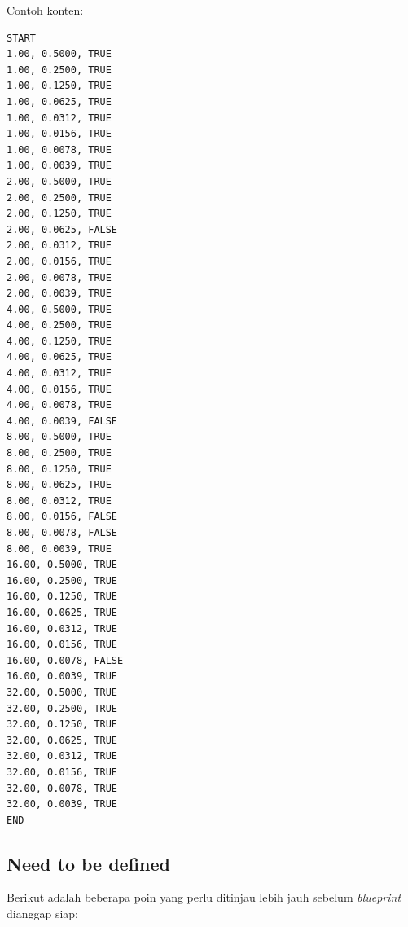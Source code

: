\documentclass[12pt,]{article}
\begin{document}
	Contoh konten:
	\begin{verbatim}
START
1.00, 0.5000, TRUE
1.00, 0.2500, TRUE
1.00, 0.1250, TRUE
1.00, 0.0625, TRUE
1.00, 0.0312, TRUE
1.00, 0.0156, TRUE
1.00, 0.0078, TRUE
1.00, 0.0039, TRUE
2.00, 0.5000, TRUE
2.00, 0.2500, TRUE
2.00, 0.1250, TRUE
2.00, 0.0625, FALSE
2.00, 0.0312, TRUE
2.00, 0.0156, TRUE
2.00, 0.0078, TRUE
2.00, 0.0039, TRUE
4.00, 0.5000, TRUE
4.00, 0.2500, TRUE
4.00, 0.1250, TRUE
4.00, 0.0625, TRUE
4.00, 0.0312, TRUE
4.00, 0.0156, TRUE
4.00, 0.0078, TRUE
4.00, 0.0039, FALSE
8.00, 0.5000, TRUE
8.00, 0.2500, TRUE
8.00, 0.1250, TRUE
8.00, 0.0625, TRUE
8.00, 0.0312, TRUE
8.00, 0.0156, FALSE
8.00, 0.0078, FALSE
8.00, 0.0039, TRUE
16.00, 0.5000, TRUE
16.00, 0.2500, TRUE
16.00, 0.1250, TRUE
16.00, 0.0625, TRUE
16.00, 0.0312, TRUE
16.00, 0.0156, TRUE
16.00, 0.0078, FALSE
16.00, 0.0039, TRUE
32.00, 0.5000, TRUE
32.00, 0.2500, TRUE
32.00, 0.1250, TRUE
32.00, 0.0625, TRUE
32.00, 0.0312, TRUE
32.00, 0.0156, TRUE
32.00, 0.0078, TRUE
32.00, 0.0039, TRUE
END
	\end{verbatim}
	
	\newpage
	\subsection{Need to be defined}
	
	Berikut adalah beberapa poin yang perlu ditinjau lebih jauh sebelum \textit{blueprint} dianggap siap:
	
\end{document}
